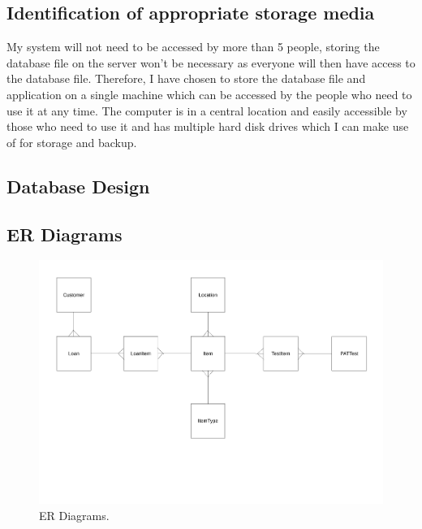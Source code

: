 \subsection{Identification of appropriate storage media}

My system will not need to be accessed by more than 5 people, storing the database file on the server won't be necessary as everyone will then have access to the database file. Therefore, I have chosen to store the database file and application on a single machine which can be accessed by the people who need to use it at any time. The computer is in a central location and easily accessible by those who need to use it and has multiple hard disk drives which I can make use of for storage and backup.  

\newpage

\begin{landscape}

\section{Database Design}

\subsection{ER Diagrams}

\begin{figure}[H]
    \centerline{\includegraphics[width=550px]{./Design/ER_Diagrams/ER_Diagram.pdf}}
    \caption{ER Diagrams.} \label{fig:ER Diagrams}
\end{figure}

\end{landscape}


